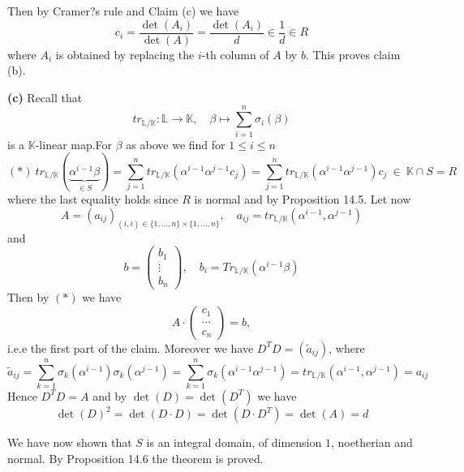 \documentclass[12pt]{book}
\begin{document}
\begin{spacing}{1.3}
\begin{compactenum}
\begin{compactenum}
Then by Cramer?s rule and Claim (c) we have
$$c_i= \frac{\det(A_i)}{\det(A)} = \frac{\det(A_i)}{d} \in \frac{1}{d} \in R$$
where $A_i$ is obtained by replacing the $i$-th column of $A$ by $b$. This proves claim (b).
\end{compactenum}
\item[\textbf{(c)}] Recall that 
$$tr_{\mathbb{L}/\mathbb{K}}: \mathbb{L} \longrightarrow \mathbb{K}, \quad \beta \mapsto \sum_{i=1}^n \sigma_i(\beta)$$
is a $\mathbb{K}$-linear map.For $\beta$ as above we find for $1 \leqslant i \leqslant n$
$$(*) \ tr_{\mathbb{L}/\mathbb{K}}(\underbrace{\alpha^{i-1}\beta}_{\in S})= \sum_{j=1}^n tr_{\mathbb{L}/\mathbb{K}}(\alpha^{i-1} \alpha^{j-1} c_j)=\sum_{j=1}^n tr_{\mathbb{L}/\mathbb{K}}(\alpha^{i-1}\alpha^{j-1})c_j \ \in \ \mathbb{K} \cap S = R$$
where the last equality holds since $R$ is normal and by Proposition 14.5. Let now 
$$A=\left(a_{ij}\right)_{(i,i) \in \{1,\ldots, n\} \times \{1, \ldots, n \}}, \quad a_{ij}=tr_{\mathbb{L}/\mathbb{K}}(\alpha^{i-1}, \alpha^{j-1})$$
and
$$b=\begin{pmatrix} b_1 \\ \vdots \\ b_n \end{pmatrix}, \quad b_i=Tr_{\mathbb{L}/\mathbb{K}}(\alpha^{i-1}\beta)$$
Then by $(*)$ we have
$$A \cdot \begin{pmatrix} c_1 \\ \cdots \\ c_n \end{pmatrix} = b,$$
i.e.e the first part of the claim. Moreover we have
$D^TD=\left(\tilde{a}_{ij}\right)$, where
$$\tilde{a}_{ij}=\sum_{k=1}^n \sigma_k(\alpha^{i-1}) \sigma_k(\alpha^{j-1})=\sum_{k=1}^n \sigma_k(\alpha^{i-1}\alpha^{j-1})=tr_{\mathbb{L}/\mathbb{K}}(\alpha^{i-1}, \alpha^{j-1}) = a_{ij}$$
Hence $D^TD=A$ and by $\det(D)=\det(D^T)$ we have $$\det(D)^2=\det(D\cdot D)=\det(D \cdot D^T)=\det(A)=d$$
\end{compactenum}
We have now shown that $S$ is an integral domain, of dimension $1$, noetherian and normal. By Proposition 14.6 the theorem is proved.

\newpage

\printindex

\end{spacing}
\end{document}
